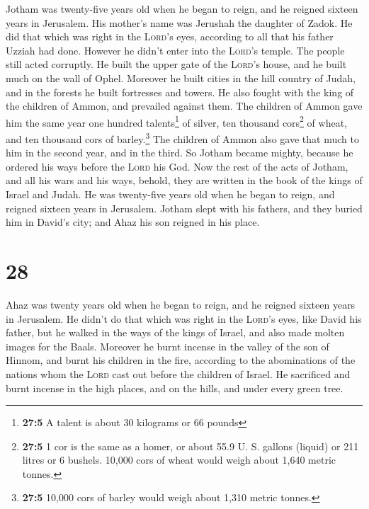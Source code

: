  Jotham was twenty-five years old when he began to reign,
and he reigned sixteen years in Jerusalem. His mother's name was
Jerushah the daughter of Zadok.  He did that which was
right in the \textsc{Lord}'s eyes, according to all that his father
Uzziah had done. However he didn't enter into the \textsc{Lord}'s
temple. The people still acted corruptly.  He built the
upper gate of the \textsc{Lord}'s house, and he built much on the wall
of Ophel.  Moreover he built cities in the hill country of
Judah, and in the forests he built fortresses and towers. 
He also fought with the king of the children of Ammon, and prevailed
against them. The children of Ammon gave him the same year one hundred
talents\footnote{\textbf{27:5} A talent is about 30 kilograms or 66
  pounds} of silver, ten thousand cors\footnote{\textbf{27:5} 1 cor is
  the same as a homer, or about 55.9 U. S. gallons (liquid) or 211
  litres or 6 bushels. 10,000 cors of wheat would weigh about 1,640
  metric tonnes.} of wheat, and ten thousand cors of barley.\footnote{\textbf{27:5}
  10,000 cors of barley would weigh about 1,310 metric tonnes.} The
children of Ammon also gave that much to him in the second year, and in
the third.  So Jotham became mighty, because he ordered
his ways before the \textsc{Lord} his God.  Now the rest
of the acts of Jotham, and all his wars and his ways, behold, they are
written in the book of the kings of Israel and Judah.  He
was twenty-five years old when he began to reign, and reigned sixteen
years in Jerusalem.  Jotham slept with his fathers, and
they buried him in David's city; and Ahaz his son reigned in his place.

\hypertarget{section-27}{%
\section{28}\label{section-27}}

 Ahaz was twenty years old when he began to reign, and he
reigned sixteen years in Jerusalem. He didn't do that which was right in
the \textsc{Lord}'s eyes, like David his father,  but he
walked in the ways of the kings of Israel, and also made molten images
for the Baals.  Moreover he burnt incense in the valley of
the son of Hinnom, and burnt his children in the fire, according to the
abominations of the nations whom the \textsc{Lord} cast out before the
children of Israel.  He sacrificed and burnt incense in
the high places, and on the hills, and under every green tree.

